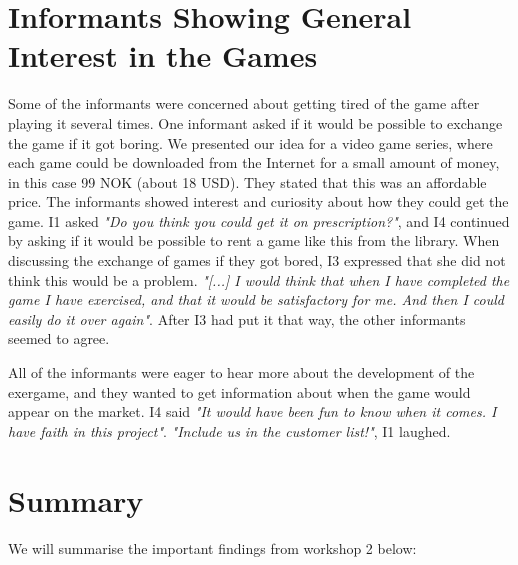 \section{Informants Showing General Interest in the Games}

Some of the informants were concerned about getting tired of the game after playing it several times. One informant asked if it would be possible to exchange the game if it got boring. We presented our idea for a video game series, where each game could be downloaded from the Internet for a small amount of money, in this case 99 NOK (about 18 USD). They stated that this was an affordable price. The informants showed interest and curiosity about how they could get the game. I1 asked \emph{"Do you think you could get it on prescription?"}, and I4 continued by asking if it would be possible to rent a game like this from the library. When discussing the exchange of games if they got bored, I3 expressed that she did not think this would be a problem. \emph{"[...] I would think that when I have completed the game I have exercised, and that it would be satisfactory for me. And then I could easily do it over again"}. After I3 had put it that way, the other informants seemed to agree.

All of the informants were eager to hear more about the development of the exergame, and they wanted to get information about when the game would appear on the market. I4 said \emph{"It would have been fun to know when it comes. I have faith in this project"}. \emph{"Include us in the customer list!"}, I1 laughed.

\section{Summary}

We will summarise the important findings from workshop 2 below:

